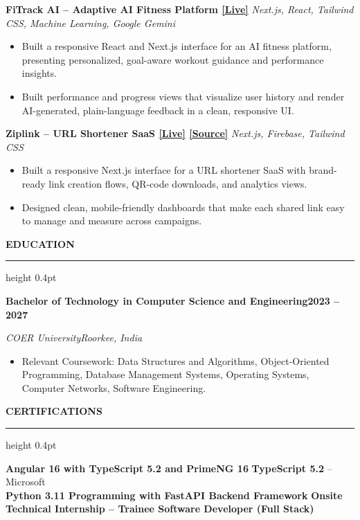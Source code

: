 \documentclass[10pt,a4paper]{article}
\newcommand{\resumeSection}[1]{%
  \vspace{5pt}
  {\normalsize\bfseries\color{heading} #1}\par
  \vspace{1pt}
  {\color{rulecolor}\hrule height 0.4pt}
  \vspace{3pt}
}
\newcommand{\resumeSubheading}[4]{%
  \textbf{#1}\hfill\textbf{#2}\par
  \textit{#3}\hfill\textit{#4}\par
  \vspace{-0.15em}
}
\newcommand{\projectHeading}[2]{%
  \textbf{#1} \textbar{} \textit{#2}\par
  \vspace{-0.15em}
}
\begin{document}
\projectHeading
{FiTrack AI -- Adaptive AI Fitness Platform \href{https://fitrack-ai.ash-labs.tech/}{[Live]}}
{Next.js, React, Tailwind CSS, Machine Learning, Google Gemini}

\begin{itemize}
  \item Built a responsive React and Next.js interface for an AI fitness
  platform, presenting personalized, goal-aware workout guidance and
  performance insights.

  \item Built performance and progress views that visualize user history and
  render AI-generated, plain-language feedback in a clean, responsive UI.
\end{itemize}

\projectHeading
{Ziplink -- URL Shortener SaaS \href{https://ziplink.ash-labs.tech}{[Live]} \href{https://github.com/Tech-aficionado/ZipLink---Open-Source}{[Source]}}
{Next.js, Firebase, Tailwind CSS}

\begin{itemize}
  \item Built a responsive Next.js interface for a URL shortener SaaS with
  brand-ready link creation flows, QR-code downloads, and analytics views.

  \item Designed clean, mobile-friendly dashboards that make each shared link
  easy to manage and measure across campaigns.
\end{itemize}

\resumeSection{EDUCATION}

\resumeSubheading
{Bachelor of Technology in Computer Science and Engineering}
{2023 -- 2027}
{COER University}
{Roorkee, India}

\begin{itemize}
  \item Relevant Coursework: Data Structures and Algorithms,
  Object-Oriented Programming, Database Management Systems, Operating
  Systems, Computer Networks, Software Engineering.
\end{itemize}

\resumeSection{CERTIFICATIONS}

{\small
\textbf{Angular 16 with TypeScript 5.2 and PrimeNG 16}
\quad \textbar{} \quad
\textbf{TypeScript 5.2} -- Microsoft
\\[2pt]
\textbf{Python 3.11 Programming with FastAPI Backend Framework}
\quad \textbar{} \quad
\textbf{Onsite Technical Internship -- Trainee Software Developer (Full Stack)}
}
\end{document}
